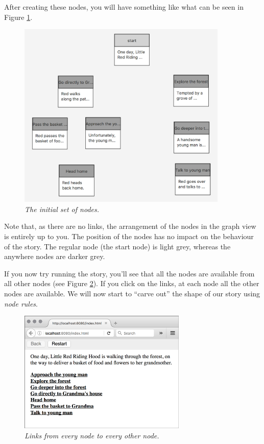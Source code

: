 \documentclass{article}
\begin{document}
After creating these nodes, you will have something like what can be seen in Figure \ref{fig:tut3:initial_nodes}.

\begin{figure}[h]
  \centering \includegraphics[width=10cm]{images/hypedyn-tutorial-3-figure-2}
  \caption{\textit{The initial set of nodes.}}
  \label{fig:tut3:initial_nodes}
\end{figure} 

Note that, as there are no links, the arrangement of the nodes in the graph view is entirely up to you. The position of the nodes has no impact on the behaviour of the story. The regular node (the start node) is light grey, whereas the anywhere nodes are darker grey.

If you now try running the story, you'll see that all the nodes are available from all other nodes (see Figure \ref{fig:tut3:running_start}). If you click on the links, at each node all the other nodes are available. We will now start to ``carve out'' the shape of our story using \textit{node rules}.

\begin{figure}[h]
  \centering
  \includegraphics[width=8cm]{images/hypedyn-tutorial-3-figure-3}
  \caption{\textit{Links from every node to every other node.}}
  \label{fig:tut3:running_start}
\end{figure} 
\end{document}

